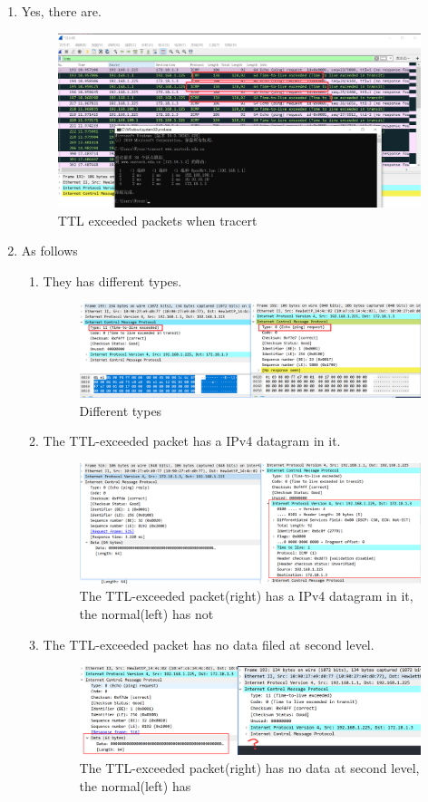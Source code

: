\documentclass[12pt,letterpaper]{ctexart}
\begin{document}
\begin{enumerate}
  \item Yes, there are.
  \begin{figure}[H]
    \centering
    \includegraphics[width=0.8\linewidth]{assets/TTL.png}
    \caption{TTL exceeded packets when tracert}
    \label{fig:packet_with_length}
  \end{figure}
  \item As follows
  \begin{enumerate}
    \item They has different types.
    \begin{figure}[H]
      \centering
      \includegraphics[width=0.8\linewidth]{assets/diff1.png}
      \caption{Different types}
    \end{figure}
    \item The TTL-exceeded packet has a IPv4 datagram in it.
    \begin{figure}[H]
      \centering
      \includegraphics[width=0.8\linewidth]{assets/diff2.png}
      \caption{The TTL-exceeded packet(right) has a IPv4 datagram in it, the normal(left) has not}
    \end{figure}
    \item The TTL-exceeded packet has no data filed at second level.
    \begin{figure}[H]
      \centering
      \includegraphics[width=0.8\linewidth]{assets/diff3.png}
      \caption{The TTL-exceeded packet(right) has no data at second level, the normal(left) has}
    \end{figure}
  \end{enumerate}
\end{enumerate}
\end{document}
